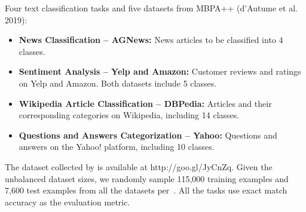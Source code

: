 \documentclass{article} \usepackage{iclr2020_conference,times}
\begin{document}
\noindent Four text classification tasks and five datasets from MBPA++ (d’Autume et al. 2019):

\begin{itemize}
\item \textbf{News Classification -- AGNews:} News articles to be classified into 4 classes.
\item \textbf{Sentiment Analysis -- Yelp and Amazon:} Customer reviews and ratings on Yelp and Amazon. Both datasets include 5 classes.
\item \textbf{Wikipedia Article Classification -- DBPedia:} Articles and their corresponding categories on Wikipedia, including 14 classes.
\item \textbf{Questions and Answers Categorization -- Yahoo:} Questions and answers on the Yahoo! platform, including 10 classes.
\end{itemize}
The dataset collected by \citet{cls} is available at http://goo.gl/JyCnZq. Given the unbalanced dataset sizes, we randomly sample 115,000 training examples and 7,600 test examples from all the datasets per~\citet{d2019episodic}. 
All the tasks use exact match accuracy as the evaluation metric.

\begin{comment}
\section{MAS Implementation}
The original paper of MAS indicates it is possible to utilize unlabeled data to estimate the importance of the weights by measuring the sensitivity to the outputs; However, it is not clear what is the "outputs" indicated in the paper. We traced the code of their implementation on github \footnote{https://github.com/rahafaljundi/MAS-Memory-Aware-Synapses} and found they use the outputs right before the softmax layer. Yet, we have misgivings about the L2-Norm implementing on the outputs. First, not like common classification tasks mentioned in the paper, the outputs of a language model involving a huge dimensions due to its vocabulary size. We concern about if it results in a low variety of outputs (after L2-Norm) because we also squares a huge number of negative values that makes certain dimensions not so outstanding. Second, a negative value, let's say -1,000 is not so different from a tremendous negative value, let's say -100,000,000 after the softmax function. Obviously the magnitude for negative values before and after softmax function is not consistent. Also, considering an extreme situation that all outputs before softmax function are negative, which means the model is not so sure about the result; If we square all those negative values and calculate gradients as parameter importance, it might lead to a misleading. For the reasons mentioned above, we also compare the result before and after softmax function.
\end{comment}
\end{document}
